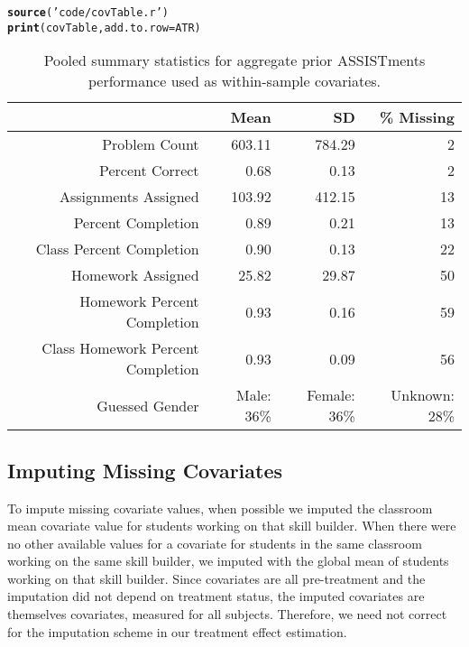 \documentclass[12pt]{article}\usepackage[]{graphicx}\usepackage[]{xcolor}
\makeatletter
\newcommand{\hlstr}[1]{\textcolor[rgb]{0.192,0.494,0.8}{#1}}%
\newcommand{\hlstd}[1]{\textcolor[rgb]{0.345,0.345,0.345}{#1}}%
\newcommand{\hlkwc}[1]{\textcolor[rgb]{0.333,0.667,0.333}{#1}}%
\newcommand{\hlkwd}[1]{\textcolor[rgb]{0.737,0.353,0.396}{\textbf{#1}}}%
\newenvironment{kframe}{%
 \def\at@end@of@kframe{}%
 \ifinner\ifhmode%
  \def\at@end@of@kframe{\end{minipage}}%
  \begin{minipage}{\columnwidth}%
 \fi\fi%
 \def\FrameCommand##1{\hskip\@totalleftmargin \hskip-\fboxsep
 \colorbox{shadecolor}{##1}\hskip-\fboxsep
     \hskip-\linewidth \hskip-\@totalleftmargin \hskip\columnwidth}%
 \MakeFramed {\advance\hsize-\width
   \@totalleftmargin\z@ \linewidth\hsize
   \@setminipage}}%
 {\par\unskip\endMakeFramed%
 \at@end@of@kframe}
\makeatother
\begin{document}
\begin{kframe}
\begin{alltt}
\hlkwd{source}\hlstd{(}\hlstr{'code/covTable.r'}\hlstd{)}
\hlkwd{print}\hlstd{(covTable,} \hlkwc{add.to.row}\hlstd{=ATR)}
\end{alltt}
\end{kframe}%
\begin{table}[ht]
\centering
\begin{tabular}{rrrr}
  \hline
 & Mean & SD & \% Missing \\ 
  \hline
Problem Count & 603.11 & 784.29 & 2 \\ 
  Percent Correct & 0.68 & 0.13 & 2 \\ 
  Assignments Assigned & 103.92 & 412.15 & 13 \\ 
  Percent Completion & 0.89 & 0.21 & 13 \\ 
  Class Percent Completion & 0.90 & 0.13 & 22 \\ 
  Homework Assigned & 25.82 & 29.87 & 50 \\ 
  Homework Percent Completion & 0.93 & 0.16 & 59 \\ 
  Class Homework Percent Completion & 0.93 & 0.09 & 56 \\ 
   Guessed Gender&Male: 36\%&Female: 36\%&Unknown: 28\%\\
 \hline
\end{tabular}
\caption{Pooled summary statistics for aggregate prior ASSISTments performance used as within-sample covariates.} 
\label{tab:covariates}
\end{table}


\subsection{Imputing Missing Covariates}

To impute missing covariate values, when possible we imputed the
classroom mean covariate value for students working on that skill
builder.
When there were no other available values for a covariate for students
in the same classroom working on the same skill builder, we imputed
with the global mean of students working on that skill builder.
Since covariates are all pre-treatment and the imputation did not
depend on treatment status, the imputed covariates are themselves
covariates, measured for all subjects.
Therefore, we need not correct for the imputation scheme in our
treatment effect estimation.
\end{document}
